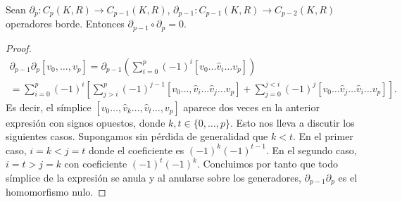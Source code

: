 \begin{lema}
	Sean $\partial_p : C_p(K,R) \to C_{p-1}(K,R)$, $\partial_{p-1} : C_{p-1}(K,R) \to C_{p-2}(K,R)$ operadores borde. Entonces \(\partial_{p-1} \circ \partial_p = 0\).
\end{lema}
\begin{proof}
	\begin{gather*}
	\partial_{p-1} \partial_p[v_0, \ldots, v_p] = \partial_{p-1} \left( \sum_{i=0}^{p} (-1)^i[v_0 \dots \hat{v}_i \dots v_p] \right) \\
	= \sum_{i=0}^{p} (-1)^i \left[ \sum_{j>i}^{p} (-1)^{j-1}[v_0 \dots, \hat{v}_i \dots \hat{v}_j \ldots v_p]
	+ \sum_{j=0}^{j<i} (-1)^j[v_0 \ldots \hat{v}_j \ldots \hat{v}_i \ldots v_p] \right].
	\end{gather*}
	Es decir, el símplice $[v_0\dots,\hat{v}_k\dots,\hat{v}_t \dots, v_p]$ aparece dos veces en la anterior expresión con signos opuestos, donde $k,t \in \{0, \dots, p\}$. Esto nos lleva a discutir los siguientes casos. Supongamos sin pérdida de generalidad que $k < t$. En el primer caso, $i = k < j = t$ donde el coeficiente es $(-1)^k(-1)^{t-1}$. En el segundo caso, $i = t > j = k$ con coeficiente $(-1)^t(-1)^k$. Concluimos por tanto que todo símplice de la expresión se anula y al anularse sobre los generadores, $\partial_{p-1} \partial_p$ es el homomorfismo nulo.
\end{proof}

